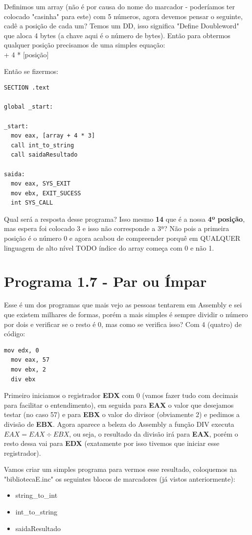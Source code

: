 Definimos um array (não é por causa do nome do marcador - poderíamos ter colocado "casinha" para este) com 5 números, agora devemos pensar o seguinte, cadê a posição de cada um? Temos um DD, isso significa "Define Doubleword" que aloca 4 bytes (a chave aqui é o número de bytes). Então para obtermos qualquer posição precisamos de uma simples equação: \\
{ + 4 * [posição]}

Então se fizermos:
\begin{lstlisting}[]
SECTION .text

global _start:

_start:
  mov eax, [array + 4 * 3]
  call int_to_string
  call saidaResultado

saida:
  mov eax, SYS_EXIT
  mov ebx, EXIT_SUCESS
  int SYS_CALL 	
\end{lstlisting}

Qual será a resposta desse programa? Isso mesmo \textbf{14} que é a nossa \textbf{4º posição}, mas espera foi  colocado 3 e isso não corresponde a 3ª? Não pois a primeira posição é o número 0 e agora acabou de compreender porquê em QUALQUER linguagem de alto nível TODO índice do array começa com 0 e não 1.

\section{Programa 1.7 - Par ou Ímpar}
Esse é um dos programas que mais vejo as pessoas tentarem em Assembly e sei que existem milhares de formas, porém a mais simples é sempre dividir o número por dois e verificar se o resto é 0, mas como se verifica isso? Com 4 (quatro) de código:
\begin{lstlisting}[]
  mov edx, 0
  mov eax, 57
  mov ebx, 2
  div ebx
\end{lstlisting}

Primeiro iniciamos o registrador \textbf{EDX} com 0 (vamos fazer tudo com decimais para facilitar o entendimento), em seguida para \textbf{EAX} o valor que desejamos testar (no caso 57) e para \textbf{EBX} o valor do divisor (obviamente 2) e pedimos a divisão de \textbf{EBX}. Agora aparece a beleza do Assembly a função DIV executa $EAX = EAX \div EBX$, ou seja, o resultado da divisão irá para \textbf{EAX}, porém o resto dessa 
vai para \textbf{EDX} (exatamente por isso tivemos que iniciar esse registrador).

Vamos criar um simples programa para vermos esse resultado, coloquemos na "bibliotecaE.inc" os seguintes blocos de marcadores (já vistos anteriormente):
\begin{itemize}[nolistsep]
	\item string\_to\_int
	\item int\_to\_string
	\item saidaResultado
\end{itemize}

